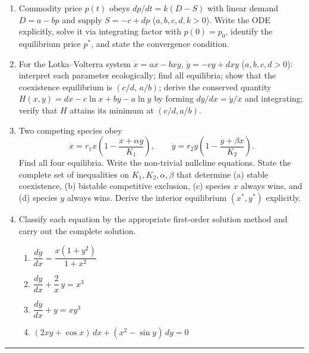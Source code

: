 \begin{enumerate}[leftmargin=2em, itemsep=8pt]
    \item Commodity price $p(t)$ obeys $dp/dt = k(D - S)$ with linear demand
          $D = a - bp$ and supply $S = -c + dp$ ($a,b,c,d,k > 0$). Write the
          ODE explicitly, solve it via integrating factor with $p(0) = p_0$,
          identify the equilibrium price $p^*$, and state the convergence
          condition.

    \item For the Lotka--Volterra system $\dot{x} = ax - bxy$,
          $\dot{y} = -cy + dxy$ ($a,b,c,d > 0$): interpret each parameter
          ecologically; find all equilibria; show that the coexistence
          equilibrium is $(c/d,\, a/b)$; derive the conserved quantity
          $H(x,y) = dx - c\ln x + by - a\ln y$ by forming $dy/dx = \dot{y}/\dot{x}$
          and integrating; verify that $H$ attains its minimum at $(c/d, a/b)$.

    \item Two competing species obey
          \[
            \dot{x} = r_1 x\!\left(1 - \frac{x + \alpha y}{K_1}\right),
            \qquad
            \dot{y} = r_2 y\!\left(1 - \frac{y + \beta x}{K_2}\right).
          \]
          Find all four equilibria. Write the non-trivial nullcline equations.
          State the complete set of inequalities on $K_1, K_2, \alpha, \beta$
          that determine (a) stable coexistence, (b) bistable competitive
          exclusion, (c) species $x$ always wins, and (d) species $y$ always
          wins. Derive the interior equilibrium $(x^*, y^*)$ explicitly.

    \item Classify each equation by the appropriate first-order solution method
          and carry out the complete solution.
          \begin{enumerate}[label=(\alph*), itemsep=4pt]
            \item $\dfrac{dy}{dx} = \dfrac{x(1+y^2)}{1+x^2}$
            \item $\dfrac{dy}{dx} + \dfrac{2}{x}\,y = x^3$
            \item $\dfrac{dy}{dx} + y = xy^3$
            \item $(2xy + \cos x)\,dx + (x^2 - \sin y)\,dy = 0$
          \end{enumerate}

\end{enumerate}

\vspace{0.4em}
\hrule
\vspace{0.6em}

